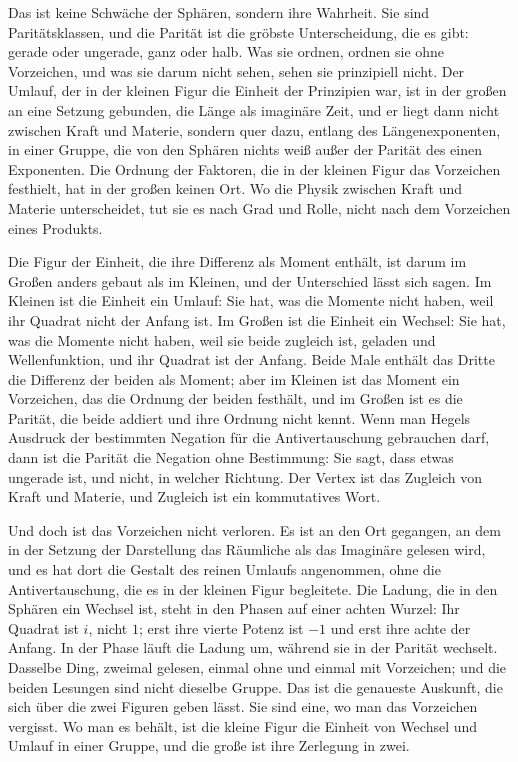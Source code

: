 \documentclass[11pt,a4paper]{article}
\begin{document}
Das ist keine Schwäche der Sphären, sondern ihre Wahrheit. Sie sind Paritätsklassen, und die Parität ist die gröbste Unterscheidung, die es gibt: gerade oder ungerade, ganz oder halb. Was sie ordnen, ordnen sie ohne Vorzeichen, und was sie darum nicht sehen, sehen sie prinzipiell nicht. Der Umlauf, der in der kleinen Figur die Einheit der Prinzipien war, ist in der großen an eine Setzung gebunden, die Länge als imaginäre Zeit, und er liegt dann nicht zwischen Kraft und Materie, sondern quer dazu, entlang des Längenexponenten, in einer Gruppe, die von den Sphären nichts weiß außer der Parität des einen Exponenten. Die Ordnung der Faktoren, die in der kleinen Figur das Vorzeichen festhielt, hat in der großen keinen Ort. Wo die Physik zwischen Kraft und Materie unterscheidet, tut sie es nach Grad und Rolle, nicht nach dem Vorzeichen eines Produkts.

Die Figur der Einheit, die ihre Differenz als Moment enthält, ist darum im Großen anders gebaut als im Kleinen, und der Unterschied lässt sich sagen. Im Kleinen ist die Einheit ein Umlauf: Sie hat, was die Momente nicht haben, weil ihr Quadrat nicht der Anfang ist. Im Großen ist die Einheit ein Wechsel: Sie hat, was die Momente nicht haben, weil sie beide zugleich ist, geladen und Wellenfunktion, und ihr Quadrat ist der Anfang. Beide Male enthält das Dritte die Differenz der beiden als Moment; aber im Kleinen ist das Moment ein Vorzeichen, das die Ordnung der beiden festhält, und im Großen ist es die Parität, die beide addiert und ihre Ordnung nicht kennt. Wenn man Hegels Ausdruck der bestimmten Negation für die Antivertauschung gebrauchen darf, dann ist die Parität die Negation ohne Bestimmung: Sie sagt, dass etwas ungerade ist, und nicht, in welcher Richtung. Der Vertex ist das Zugleich von Kraft und Materie, und Zugleich ist ein kommutatives Wort.

Und doch ist das Vorzeichen nicht verloren. Es ist an den Ort gegangen, an dem in der Setzung der Darstellung das Räumliche als das Imaginäre gelesen wird, und es hat dort die Gestalt des reinen Umlaufs angenommen, ohne die Antivertauschung, die es in der kleinen Figur begleitete. Die Ladung, die in den Sphären ein Wechsel ist, steht in den Phasen auf einer achten Wurzel: Ihr Quadrat ist $i$, nicht $1$; erst ihre vierte Potenz ist $-1$ und erst ihre achte der Anfang. In der Phase läuft die Ladung um, während sie in der Parität wechselt. Dasselbe Ding, zweimal gelesen, einmal ohne und einmal mit Vorzeichen; und die beiden Lesungen sind nicht dieselbe Gruppe. Das ist die genaueste Auskunft, die sich über die zwei Figuren geben lässt. Sie sind eine, wo man das Vorzeichen vergisst. Wo man es behält, ist die kleine Figur die Einheit von Wechsel und Umlauf in einer Gruppe, und die große ist ihre Zerlegung in zwei.
\end{document}
